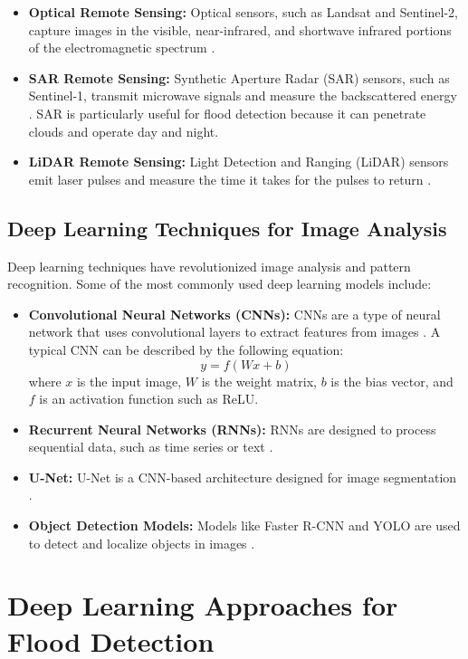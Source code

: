 \documentclass{article}
\begin{document}
\begin{itemize}
    \item \textbf{Optical Remote Sensing:} Optical sensors, such as Landsat and Sentinel-2, capture images in the visible, near-infrared, and shortwave infrared portions of the electromagnetic spectrum \cite{Wulder2012}.
    \item \textbf{SAR Remote Sensing:} Synthetic Aperture Radar (SAR) sensors, such as Sentinel-1, transmit microwave signals and measure the backscattered energy \cite{Burgess2014}. SAR is particularly useful for flood detection because it can penetrate clouds and operate day and night.
    \item \textbf{LiDAR Remote Sensing:} Light Detection and Ranging (LiDAR) sensors emit laser pulses and measure the time it takes for the pulses to return \cite{Wagner2009}.
\end{itemize}

\subsection{Deep Learning Techniques for Image Analysis}

Deep learning techniques have revolutionized image analysis and pattern recognition. Some of the most commonly used deep learning models include:

\begin{itemize}
    \item \textbf{Convolutional Neural Networks (CNNs):} CNNs are a type of neural network that uses convolutional layers to extract features from images \cite{Krizhevsky2012}. A typical CNN can be described by the following equation:
        \[
        y = f(Wx + b)
        \]
        where \( x \) is the input image, \( W \) is the weight matrix, \( b \) is the bias vector, and \( f \) is an activation function such as ReLU.
    \item \textbf{Recurrent Neural Networks (RNNs):} RNNs are designed to process sequential data, such as time series or text \cite{Hochreiter1997}.
    \item \textbf{U-Net:} U-Net is a CNN-based architecture designed for image segmentation \cite{Ronneberger2015}.
    \item \textbf{Object Detection Models:} Models like Faster R-CNN and YOLO are used to detect and localize objects in images \cite{Ren2015, Redmon2016}.
\end{itemize}

\section{Deep Learning Approaches for Flood Detection}
\end{document}
